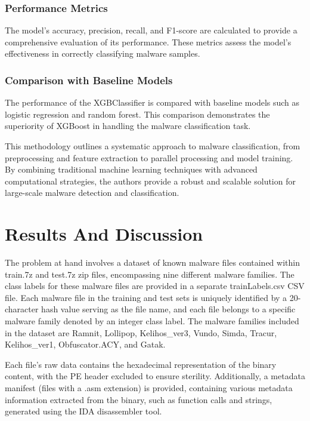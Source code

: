 \documentclass[conference]{IEEEtran}
\begin{document}
\subsubsection{Performance Metrics}
The model's accuracy, precision, recall, and F1-score are calculated to provide a comprehensive evaluation of its performance. These metrics assess the model's effectiveness in correctly classifying malware samples.


\subsubsection{Comparison with Baseline Models}
The performance of the XGBClassifier is compared with baseline models such as logistic regression and random forest. This comparison demonstrates the superiority of XGBoost in handling the malware classification task.

This methodology outlines a systematic approach to malware classification, from preprocessing and feature extraction to parallel processing and model training. By combining traditional machine learning techniques with advanced computational strategies, the authors provide a robust and scalable solution for large-scale malware detection and classification.

\section{Results And Discussion}


The problem at hand involves a dataset of known malware files contained within train.7z and test.7z zip files, encompassing nine different malware families. The class labels for these malware files are provided in a separate trainLabels.csv CSV file. Each malware file in the training and test sets is uniquely identified by a 20-character hash value serving as the file name, and each file belongs to a specific malware family denoted by an integer class label. The malware families included in the dataset are Ramnit, Lollipop, Kelihos\_ver3, Vundo, Simda, Tracur, Kelihos\_ver1, Obfuscator.ACY, and Gatak.

Each file's raw data contains the hexadecimal representation of the binary content, with the PE header excluded to ensure sterility. Additionally, a metadata manifest (files with a .asm extension) is provided, containing various metadata information extracted from the binary, such as function calls and strings, generated using the IDA disassembler tool.
\end{document}
